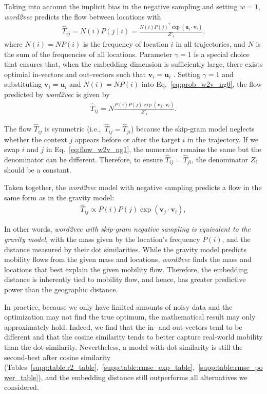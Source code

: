 \documentclass[12pt,a4paper]{article}
\newcommand{\vect}[1]{\boldsymbol{#1}}
\def\given{\mid}
\def\ie{i.e.,~}
\begin{document}
Taking into account the implicit bias in the negative sampling  and setting $w=1$, \textit{word2vec} predicts the flow between locations with
\begin{align}
	\widehat{T}_{ij} =  N(i) P(j\given i) = \frac{N(i) P(j)^\gamma \exp(\vect{u}_j \cdot \vect{v}_{i})}{Z'_i}. \label{eq:prob_w2v_ng0}
\end{align}
where $N(i) = N P(i)$ is the frequency of location $i$ in all trajectories, and $N$ is the sum of the frequencies of all locations.
Parameter $\gamma=1$ is a special choice that ensures that, when the embedding dimension is sufficiently large, there exists optimial in-vectors and out-vectors such that $\vect{v}_i = \vect{u}_i$ \autocite{levy2014neural}.
Setting $\gamma = 1$ and substituting $\vect{v}_i = \vect{u}_i$ and $N(i) = N P(i)$ into Eq.~\eqref{eq:prob_w2v_ng0}, the flow predicted by {\it word2vec} is given by
\begin{align}
	\widehat{T}_{ij} =  N \frac{P(i)P(j)\exp(\vect{v}_j \cdot \vect{v}_{i})}{Z'_i}. \label{eq:flow_w2v_ng1}
\end{align}

The flow $\widehat{T}_{ij}$ is symmetric (\ie $\widehat{T}_{ij}=\widehat{T}_{ji}$) because the skip-gram model neglects whether the context $j$ appears before or after the target $i$ in the trajectory.
If we swap $i$ and $j$ in Eq.~\eqref{eq:flow_w2v_ng1}, the numerator remains the same but the denominator can be different.
Therefore, to ensure $\widehat{T}_{ij}=\widehat{T}_{ji}$, the denominator $Z_i$ should be a constant.

Taken together, the {\it word2vec} model with negative sampling predicts a flow in the same form as in the gravity model:
\begin{align}
	\widehat{T}_{ij} \propto  P(i) P(j)  \exp(\vect{v}_j \cdot \vect{v}_{i}), \label{eq:flow_w2v_ng0}
\end{align}

In other words, \emph{word2vec with skip-gram negative sampling is equivalent to the gravity model}, with the mass given by the location's frequency $P(i)$, and the distance measured by their dot similarities.
While the gravity model predicts mobility flows from the given mass and locations, {\it word2vec} finds the mass and locations that best explain the given mobility flow.
Therefore, the embedding distance is inherently tied to mobility flow, and hence, has greater predictive power than the geographic distance.

In practice, because we only have limited amounts of noisy data and the optimization may not find the true optimum, the mathematical result may only approximately hold.
Indeed, we find that the in- and out-vectors tend to be different and that the cosine similarity tends to better capture real-world mobility than the dot similarity.
Nevertheless, a model with dot similarity is still the second-best after cosine similarity (Tables~\ref{supp:table:r2_table},~\ref{supp:table:rmse_exp_table},~\ref{supp:table:rmse_power_table}), and the embedding distance still outperforms all alternatives we considered.
\end{document}

